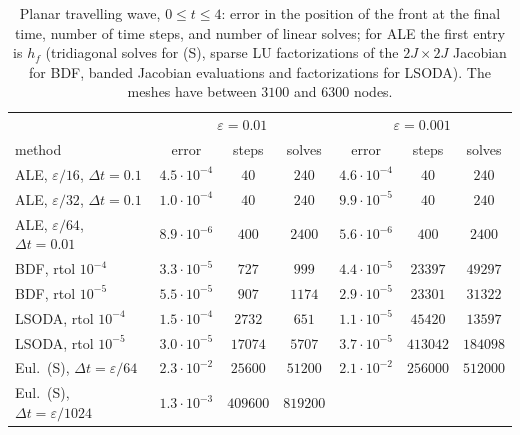 \documentclass[11pt]{amsart}
\theoremstyle{definition}
\theoremstyle{remark}
\newcommand{\ve}{\varepsilon}
\begin{document}
\begin{table}[ht]
\centering
\footnotesize
\setlength{\tabcolsep}{4pt}
\begin{tabular}{l ccc ccc}
\toprule
& \multicolumn{3}{c}{$\ve=0.01$} & \multicolumn{3}{c}{$\ve=0.001$}\\
method & error & steps & solves & error & steps & solves\\
\midrule
ALE, $\ve/16$, $\Delta t=0.1$  & $4.5\cdot10^{-4}$ & $40$ & $240$ & $4.6\cdot10^{-4}$ & $40$ & $240$\\
ALE, $\ve/32$, $\Delta t=0.1$  & $1.0\cdot10^{-4}$ & $40$ & $240$ & $9.9\cdot10^{-5}$ & $40$ & $240$\\
ALE, $\ve/64$, $\Delta t=0.01$ & $8.9\cdot10^{-6}$ & $400$ & $2400$ & $5.6\cdot10^{-6}$ & $400$ & $2400$\\
BDF, rtol $10^{-4}$                & $3.3\cdot10^{-5}$ & $727$ & $999$ & $4.4\cdot10^{-5}$ & $23397$ & $49297$\\
BDF, rtol $10^{-5}$                & $5.5\cdot10^{-5}$ & $907$ & $1174$ & $2.9\cdot10^{-5}$ & $23301$ & $31322$\\
LSODA, rtol $10^{-4}$              & $1.5\cdot10^{-4}$ & $2732$ & $651$ & $1.1\cdot10^{-5}$ & $45420$ & $13597$\\
LSODA, rtol $10^{-5}$              & $3.0\cdot10^{-5}$ & $17074$ & $5707$ & $3.7\cdot10^{-5}$ & $413042$ & $184098$\\
Eul.\ (S), $\Delta t=\ve/64$     & $2.3\cdot10^{-2}$ & $25600$ & $51200$ & $2.1\cdot10^{-2}$ & $256000$ & $512000$\\
Eul.\ (S), $\Delta t=\ve/1024$   & $1.3\cdot10^{-3}$ & $409600$ & $819200$ & & &\\
\bottomrule
\end{tabular}
\caption{Planar travelling wave, $0\le t\le4$: error in the position of the front at the
final time, number of time steps, and number of linear solves; for ALE the first entry
is $h_f$ (tridiagonal solves for
(S), sparse LU factorizations of the $2J\times2J$ Jacobian for BDF, banded Jacobian
evaluations and factorizations for LSODA). The meshes have between $3100$ and $6300$
nodes.}\label{tab:work}
\end{table}
\end{document}
